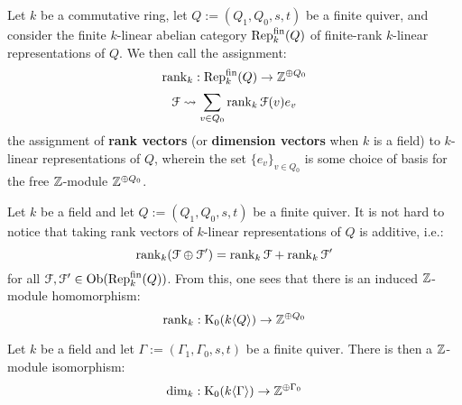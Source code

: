             \begin{definition} \label{def: dimension_vectors_of_quiver_representations}
                Let $k$ be a commutative ring, let $Q := (Q_1, Q_0, s, t)$ be a finite quiver, and consider the finite $k$-linear abelian category $\mathrm{Rep}_k^{\mathrm{fin}}(Q)$ of finite-rank $k$-linear representations of $Q$. We then call the assignment:
                    $$\operatorname{rank}_k: \mathrm{Rep}_k^{\mathrm{fin}}(Q) \to \mathbb{Z}^{\oplus Q_0}$$
                    $$\mathcal{F} \leadsto \sum_{v \in Q_0} \operatorname{rank}_k \mathcal{F}(v) e_v$$
                the assignment of \textbf{rank vectors} (or \textbf{dimension vectors} when $k$ is a field) to $k$-linear representations of $Q$, wherein the set $\{e_v\}_{v \in Q_0}$ is some choice of basis for the free $\mathbb{Z}$-module $\mathbb{Z}^{\oplus Q_0}$.
            \end{definition}
            \begin{remark} \label{remark: taking_dimension_vectors_is_Z_linear}
                Let $k$ be a field and let $Q := (Q_1, Q_0, s, t)$ be a finite quiver. It is not hard to notice that taking rank vectors of $k$-linear representations of $Q$ is additive, i.e.:
                    $$\operatorname{rank}_k (\mathcal{F} \oplus \mathcal{F}') = \operatorname{rank}_k \mathcal{F} + \operatorname{rank}_k \mathcal{F}'$$
                for all $\mathcal{F}, \mathcal{F}' \in \mathrm{Ob}(\mathrm{Rep}_k^{\mathrm{fin}}(Q))$. From this, one sees that there is an induced $\mathbb{Z}$-module homomorphism:
                    $$\operatorname{rank}_k: \mathrm{K}_0(k\langle Q\rangle) \to \mathbb{Z}^{\oplus Q_0}$$
            \end{remark}
            \begin{lemma} \label{lemma: representations_of_dynkin_quivers_are_determined_by_dimension_vectors}
                Let $k$ be a field and let $\Gamma := (\Gamma_1, \Gamma_0, s, t)$ be a finite quiver. There is then a $\mathbb{Z}$-module isomorphism:
                    $$\dim_k: \mathrm{K}_0(k\langle\Gamma\rangle) \to \mathbb{Z}^{\oplus \Gamma_0}$$
            \end{lemma}
